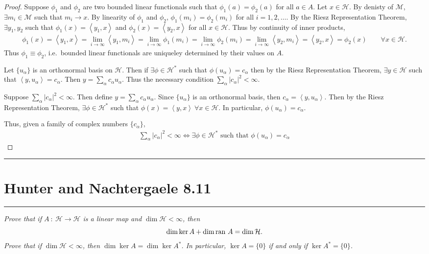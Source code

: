 \documentclass{article} %
\theoremstyle{plain}
\newcommand{\VEC}[2]{\left\langle #1, #2 \right\rangle}
\newcommand{\ran}{\text{\rm ran }}
\newcommand{\problem}[1]{
\vspace{.375cm}
\begin{minipage}{\textwidth}
    \begin{center}
        \noindent\rule{5cm}{1pt}
    \end{center}
    \section{\bf #1}
    \begin{center}
        \noindent\rule{5cm}{1pt}
    \end{center}
    \vspace{0.25cm}
\end{minipage}
}
\numberwithin{equation}{section} %
\numberwithin{figure}{section} %
\numberwithin{table}{section} %
\begin{document}
\begin{proof}
    Suppose $\phi_1$ and $\phi_2$ are two bounded linear functionals such that $\phi_1(a) = \phi_2(a)$ for all $a \in A$.  Let $x \in \mathcal{H}$.  By denisty of $\mathcal{M}$, $\exists m_i \in \mathcal{M}$ such that $m_i \rightarrow x$.  By linearity of $\phi_1$ and $\phi_2$, $\phi_1(m_i) = \phi_2(m_i)$ for all $i = 1, 2, \dots$.  By the Riesz Representation Theorem, $\exists y_1, y_2$ such that $\phi_1(x) = \VEC{y_1}{x}$ and $\phi_2(x) = \VEC{y_2}{x}$ for all $x \in \mathcal{H}$.  Thus by continuity of inner products,
    \begin{align*}
        \phi_1(x) = \VEC{y_1}{x} = \lim_{i\rightarrow \infty}\VEC{y_1}{m_i} = \lim_{i\rightarrow \infty}\phi_1(m_i) = \lim_{i \rightarrow \infty}\phi_2(m_i) = \lim_{i \rightarrow \infty}\VEC{y_2}{m_i} = \VEC{y_2}{x} = \phi_2(x) \qquad \forall x \in \mathcal{H}.
    \end{align*}
    Thus $\phi_1 \equiv \phi_2$, i.e.~bounded linear functionals are uniqueley determined by their values on $A$.

    Let $\{u_\alpha\}$ is an orthonormal basis on $\mathcal{H}$.  Then if $\exists \phi \in \mathcal{H}^*$ such that $\phi(u_\alpha) = c_\alpha$ then by the Riesz Representation Theorem, $\exists y \in \mathcal{H}$ such that $\VEC{y}{u_\alpha} = c_\alpha$.  Then $y = \sum_{\alpha}c_\alpha u_\alpha$.  Thus the necessary condition $\sum_\alpha \left|c_\alpha\right|^2 < \infty$.

    Suppose $\sum_\alpha\left|c_\alpha\right|^2 < \infty$.  Then define $y = \sum_\alpha c_\alpha u_\alpha$.  Since $\{u_\alpha\}$ is an orthonormal basis, then $c_\alpha = \VEC{y}{u_\alpha}$.  Then by the Riesz Representation Theorem, $\exists \phi \in \mathcal{H}^*$ such that $\phi(x) = \VEC{y}{x}\ \forall x \in \mathcal{H}$.  In particular, $\phi(u_\alpha) = c_\alpha$.

    Thus, given a family of complex numbers $\{c_\alpha\}$,
    \begin{align*}
        \sum_\alpha \left|c_\alpha\right|^2 < \infty \iff \exists \phi \in \mathcal{H}^* \text{ such that } \phi(u_\alpha) = c_\alpha
    \end{align*}
\end{proof}










\problem{Hunter and Nachtergaele 8.11}
\emph{Prove that if $A\ :\ \mathcal{H} \rightarrow \mathcal{H}$ is a linear map and $\dim \mathcal{H} < \infty$, then $$\dim \ker A + \dim \ran A = \dim \mathcal{H}.$$  Prove that if $\dim \mathcal{H} < \infty$, then $\dim \ker A = \dim \ker A^*$.  In particular, $\ker A = \{0\}$ if and only if $\ker A^* = \{0\}$.} \\
\end{document}
